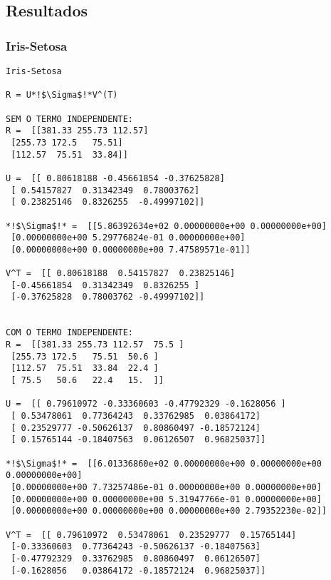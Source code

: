 \documentclass[a4paper,12pt,twoside]{article}
\begin{document}
\subsection{Resultados}
\subsubsection{Iris-Setosa}
\begin{lstlisting}
Iris-Setosa

R = U*!$\Sigma$!*V^(T)

SEM O TERMO INDEPENDENTE: 
R =  [[381.33 255.73 112.57]
 [255.73 172.5   75.51]
 [112.57  75.51  33.84]]

U =  [[ 0.80618188 -0.45661854 -0.37625828]
 [ 0.54157827  0.31342349  0.78003762]
 [ 0.23825146  0.8326255  -0.49997102]]

*!$\Sigma$!* =  [[5.86392634e+02 0.00000000e+00 0.00000000e+00]
 [0.00000000e+00 5.29776824e-01 0.00000000e+00]
 [0.00000000e+00 0.00000000e+00 7.47589571e-01]]

V^T =  [[ 0.80618188  0.54157827  0.23825146]
 [-0.45661854  0.31342349  0.8326255 ]
 [-0.37625828  0.78003762 -0.49997102]]


COM O TERMO INDEPENDENTE: 
R =  [[381.33 255.73 112.57  75.5 ]
 [255.73 172.5   75.51  50.6 ]
 [112.57  75.51  33.84  22.4 ]
 [ 75.5   50.6   22.4   15.  ]]

U =  [[ 0.79610972 -0.33360603 -0.47792329 -0.1628056 ]
 [ 0.53478061  0.77364243  0.33762985  0.03864172]
 [ 0.23529777 -0.50626137  0.80860497 -0.18572124]
 [ 0.15765144 -0.18407563  0.06126507  0.96825037]]

*!$\Sigma$!* =  [[6.01336860e+02 0.00000000e+00 0.00000000e+00 0.00000000e+00]
 [0.00000000e+00 7.73257486e-01 0.00000000e+00 0.00000000e+00]
 [0.00000000e+00 0.00000000e+00 5.31947766e-01 0.00000000e+00]
 [0.00000000e+00 0.00000000e+00 0.00000000e+00 2.79352230e-02]]

V^T =  [[ 0.79610972  0.53478061  0.23529777  0.15765144]
 [-0.33360603  0.77364243 -0.50626137 -0.18407563]
 [-0.47792329  0.33762985  0.80860497  0.06126507]
 [-0.1628056   0.03864172 -0.18572124  0.96825037]]
\end{lstlisting}
\end{document}

